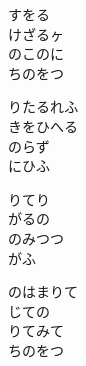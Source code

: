 \documentclass[10pt,b5j]{tarticle} %
\begin{document}
\vspace{1.5em} %
\newcommand{\linespace}{0.5em} %
\newcommand{\blocksize}{0.5\hsize} %
\begin{enumerate} %
    \begin{minipage}[c]{\blocksize}
    
        \vspace{\linespace}
        \item
        すをる\\
        けざるヶ\\
        のこのに\\
        ちのをつ
        
        \vspace{\linespace}
        \item
        りたるれふ\\
        きをひへる\\
        のらず\\
        にひふ
        
        \vspace{\linespace}
        \item
        りてり\\
        がるの\\
        のみつつ\\
        がふ
        
        \vspace{\linespace}
        \item
        のはまりて\\
        じての\\
        りてみて\\
        ちのをつ
    
    \end{minipage}
\end{enumerate} %
\end{document}
